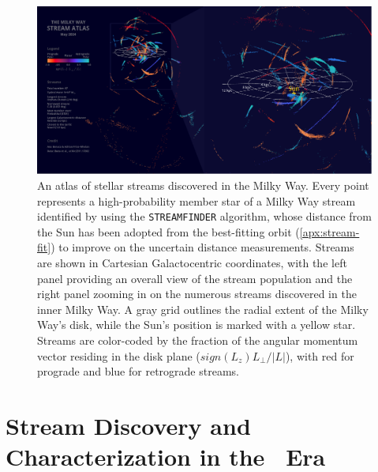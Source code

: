 \documentclass[final,5p,times,twocolumn,authoryear]{elsarticle}
\begin{document}
\begin{figure}[t!]
\begin{center}
\includegraphics[width=1\textwidth]{figures/fos_3d.pdf}
\end{center}
\caption{%
An atlas of stellar streams discovered in the Milky Way.
Every point represents a high-probability member star of a Milky Way stream identified by \citet{ibata:2023} using the \texttt{STREAMFINDER} algorithm, whose distance from the Sun has been adopted from the best-fitting orbit (\ref{apx:stream-fit}) to improve on the uncertain distance measurements.
Streams are shown in Cartesian Galactocentric coordinates, with the left panel providing an overall view of the stream population and the right panel zooming in on the numerous streams discovered in the inner Milky Way.
A gray grid outlines the radial extent of the Milky Way's disk, while the Sun's position is marked with a yellow star.
Streams are color-coded by the fraction of the angular momentum vector residing in the disk plane ($sign(L_z)L_\perp/|L|$), with red for prograde and blue for retrograde streams.
}
\label{fig:fos_3d}
\end{figure}

\section{Stream Discovery and Characterization in the \gaia\ Era}
\label{sec:discovery}
\end{document}
